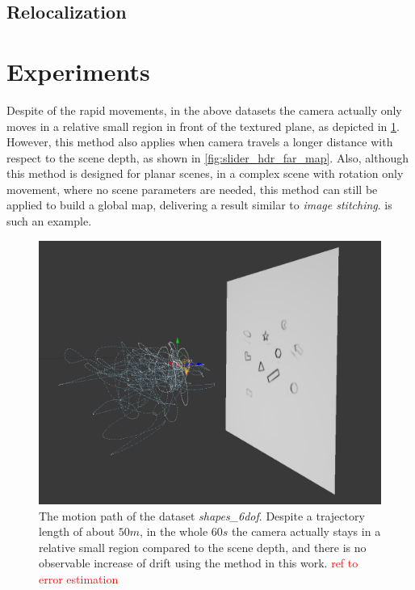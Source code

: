 \subsection{Relocalization}
\label{sec:relocalization}

\section{Experiments}
\label{sec:experiments}
Despite of the rapid movements, in the above datasets the camera
actually only moves in a relative small region in front of the
textured plane, as depicted in \cref{fig:shapes_6dof_path}. However,
this method also applies when camera travels a longer distance with
respect to the scene depth, as shown in
\cref{fig:slider_hdr_far_map}. Also, although this method is designed
for planar scenes, in a complex scene with rotation only movement,
where no scene parameters are needed, this method can still be applied
to build a global map, delivering a result similar to \textit{image
  stitching}.  is such an example.
\begin{figure}
  \centering
  \includegraphics[width=\textwidth]{images/shapes_6dof_path.png}
  \caption{The motion path of the dataset
    \textit{shapes\_6dof}. Despite a trajectory length of about $50m$,
    in the whole $60s$ the camera actually stays in a relative small
    region compared to the scene depth, and there is no observable
    increase of drift using the method in this
    work. \textcolor{red}{ref to error estimation}}
  \label{fig:shapes_6dof_path}
\end{figure}
